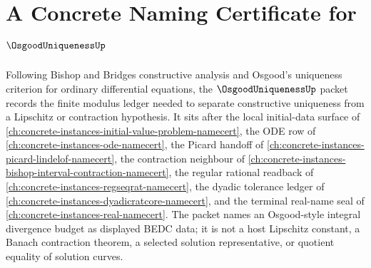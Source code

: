\chapter{A Concrete Naming Certificate for $\OsgoodUniquenessUp$}
\label{ch:concrete-instances-osgood-uniqueness-namecert}

Following Bishop and Bridges constructive analysis and Osgood's uniqueness criterion for ordinary differential equations, the $\OsgoodUniquenessUp$ packet records the finite modulus ledger needed to separate constructive uniqueness from a Lipschitz or contraction hypothesis. It sits after the local initial-data surface of \autoref{ch:concrete-instances-initial-value-problem-namecert}, the ODE row of \autoref{ch:concrete-instances-ode-namecert}, the Picard handoff of \autoref{ch:concrete-instances-picard-lindelof-namecert}, the contraction neighbour of \autoref{ch:concrete-instances-bishop-interval-contraction-namecert}, the regular rational readback of \autoref{ch:concrete-instances-regseqrat-namecert}, the dyadic tolerance ledger of \autoref{ch:concrete-instances-dyadicratcore-namecert}, and the terminal real-name seal of \autoref{ch:concrete-instances-real-namecert}. The packet names an Osgood-style integral divergence budget as displayed BEDC data; it is not a host Lipschitz constant, a Banach contraction theorem, a selected solution representative, or quotient equality of solution curves.


